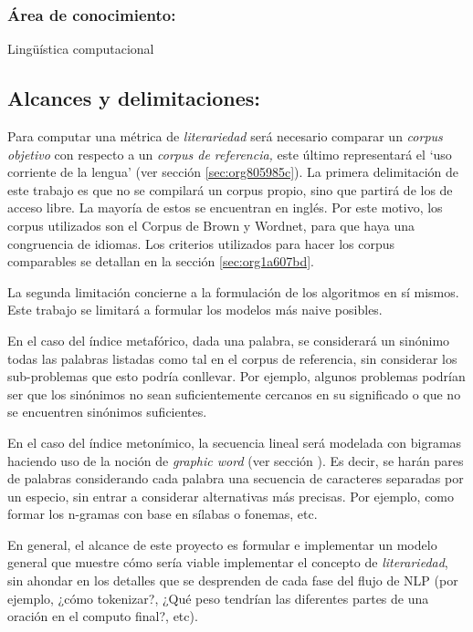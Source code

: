\documentclass[12pt,letterpaper,twoside]{article}
\begin{document}
\subsubsection{\textbf{Área de conocimiento:}}
\label{sec:org1558d88}

Lingüística computacional

\subsection{Alcances y delimitaciones:}
\label{sec:org6239a43}

Para computar una métrica de \emph{literariedad} será necesario comparar un
\emph{corpus objetivo} con respecto a un \emph{corpus de referencia,} este
último representará el ‘uso corriente de la lengua' (ver sección
\ref{sec:org805985c}). La primera delimitación de este trabajo es que no se
compilará un corpus propio, sino que partirá de los de acceso
libre. La mayoría de estos se encuentran en inglés. Por este motivo,
los corpus utilizados son el Corpus de Brown y Wordnet, para
que haya una congruencia de idiomas. Los criterios
utilizados para hacer los corpus comparables se detallan en la sección
\ref{sec:org1a607bd}.

La segunda limitación concierne a la formulación de los algoritmos en
sí mismos. Este trabajo se limitará a formular los modelos más naive
posibles.

En el caso del índice metafórico, dada una palabra, se
considerará un sinónimo todas las palabras listadas como tal en el
corpus de referencia, sin considerar los sub-problemas que esto podría
conllevar. Por ejemplo, algunos problemas podrían ser que los
sinónimos no sean suficientemente cercanos en su significado o que no
se encuentren sinónimos suficientes.

En el caso del índice metonímico, la secuencia lineal será modelada
con bigramas haciendo uso de la noción de \emph{graphic word} (ver sección
).  Es decir, se harán pares de palabras considerando cada
palabra una secuencia de caracteres separadas por un especio, sin
entrar a considerar alternativas más precisas. Por ejemplo, como
formar los n-gramas con base en sílabas o fonemas, etc.

En general, el alcance de este proyecto es formular e implementar un
modelo general que muestre cómo sería viable implementar el concepto de
\emph{literariedad}, sin ahondar en los detalles que se desprenden de cada
fase del flujo de NLP (por ejemplo, ¿cómo tokenizar?, ¿Qué peso tendrían
las diferentes partes de una oración en el computo final?, etc).
\end{document}
